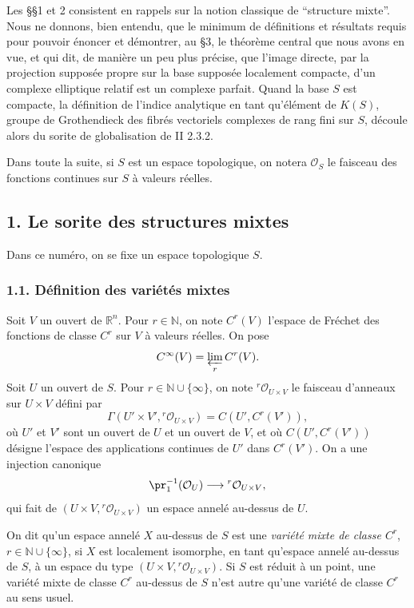 \documentclass[11pt]{article}
\providecommand{\cO}{\mathcal O}
\providecommand{\R}{\mathbb R}
\providecommand{\N}{\mathbb N}
\begin{document}
Les §§1 et 2 consistent en rappels sur la notion classique de ``structure mixte''. Nous ne donnons, bien entendu, que le minimum de définitions et résultats requis pour pouvoir énoncer et démontrer, au §3, le théorème central que nous avons en vue, et qui dit, de manière un peu plus précise, que l'image directe, par la projection supposée propre sur la base supposée localement compacte, d'un complexe elliptique relatif est un complexe parfait. Quand la base $S$ est compacte, la définition de l'indice analytique en tant qu'élément de $K(S)$, groupe de Grothendieck des fibrés vectoriels complexes de rang fini sur $S$, découle alors du sorite de globalisation de II 2.3.2.

Dans toute la suite, si $S$ est un espace topologique, on notera $\cO_S$ le faisceau des fonctions continues sur $S$ à valeurs réelles.

\subsection*{1. Le sorite des structures mixtes}

Dans ce numéro, on se fixe un espace topologique $S$.

\subsubsection*{1.1. Définition des variétés mixtes}
Soit $V$ un ouvert de $\R^n$. Pour $r\in\N$, on note $C^r(V)$ l'espace de Fréchet des fonctions de classe $C^r$ sur $V$ à valeurs réelles. On pose
\[
  C^\infty(V)=\varprojlim_r C^r(V).
\]
Soit $U$ un ouvert de $S$. Pour $r\in\N\cup\{\infty\}$, on note ${}^r\cO_{U\times V}$ le faisceau d'anneaux sur $U\times V$ défini par
\[
  \Gamma(U'\times V',{}^r\cO_{U\times V})=C(U',C^r(V')),
\]
où $U'$ et $V'$ sont un ouvert de $U$ et un ouvert de $V$, et où $C(U',C^r(V'))$ désigne l'espace des applications continues de $U'$ dans $C^r(V')$. On a une injection canonique
\[
  \pr_1^{-1}(\cO_U)\longrightarrow{}^r\cO_{U\times V},
\]
qui fait de $(U\times V,{}^r\cO_{U\times V})$ un espace annelé au-dessus de $U$.

On dit qu'un espace annelé $X$ au-dessus de $S$ est une \emph{variété mixte de classe $C^r$}, $r\in\N\cup\{\infty\}$, si $X$ est localement isomorphe, en tant qu'espace annelé au-dessus de $S$, à un espace du type $(U\times V,{}^r\cO_{U\times V})$. Si $S$ est réduit à un point, une variété mixte de classe $C^r$ au-dessus de $S$ n'est autre qu'une variété de classe $C^r$ au sens usuel.
\end{document}
